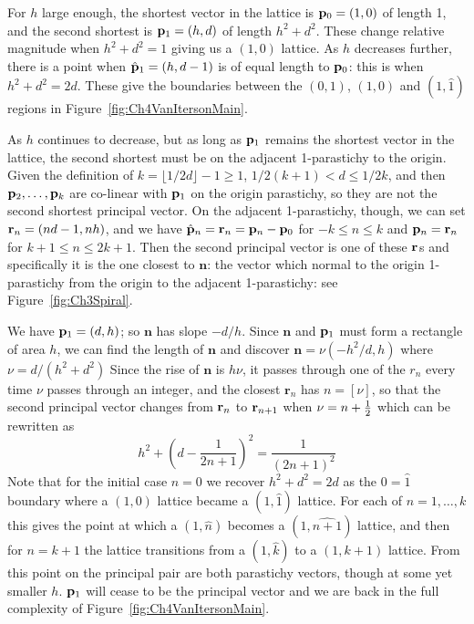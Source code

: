 \begin{jAnswer}
For $h$ large enough, 	the shortest vector in the lattice is  ${\mathbf p}_{0}=(1,0)$ 
of length 1, and the second shortest is  ${\mathbf p}_{1}=(h,d)$ of length $h^2+d^2$.
These change relative magnitude when $h^2+d^2=1$ giving us a $(1,0)$ lattice.
As $h$ decreases further, there is a point when  $\hat{\mathbf p}_{1}=(h,d-1)$ is of equal length to ${\mathbf p}_{0}$: this is when $h^2+d^2=2d$. These give the boundaries between the $(0,1)$, $(1,0)$ and $(1,\hat 1)$ regions in Figure~\ref{fig:Ch4VanItersonMain}. 

As $h$ continues to decrease, but as long as ${\mathbf p}_{1}$ remains the shortest vector in the lattice, the second shortest
must be on the adjacent 1-parastichy to the origin. Given the definition of $k=\lfloor1/2d\rfloor-1\geq 1$, $1/2(k+1)<d\leq 1/2k$,  and then ${\mathbf p}_{2},\ldots,{\mathbf p}_{k}$ are co-linear with ${\mathbf p}_{1}$ on the origin parastichy, so they are not the second shortest principal vector. On the adjacent 1-parastichy, though, we can set $\mathbf{r}_{n}=  (nd-1,n h)$, and we have $\hat{\mathbf p}_{n}=\mathbf{r}_{n}={\mathbf p}_{n}-{\mathbf p}_{0}$ for $-k\leq n\leq k$ and ${\mathbf p}_{n}=\mathbf{r}_{n}$ for $k+1\leq n\leq 2k+1$. Then the second principal vector is one of these $\mathbf{r}_{}$s and specifically it is the one closest to $\mathbf{n}$: the vector which normal to the origin 1-parastichy from the origin to the adjacent 1-parastichy: see Figure~\ref{fig:Ch3Spiral}.
%

We have ${\mathbf p}_{1}=(d,h)$; so $\mathbf{n}$  has slope $-d/h$. Since   $\mathbf{n}$ and ${\mathbf p}_{1}$
must form a rectangle of area $h$, we can find the length of  $\mathbf{n}$ and discover  $\mathbf{n} = \nu (-h^2 /d,h)$
where 
$
	\nu = 
	{d}/{(h^2+d^2)}
$
Since the rise of $\mathbf{n}$ is $h\nu$, it passes through one of the $r_n$ every time $\nu$ passes through an integer,
and the closest  $\mathbf{r}_n$ has $n=[\nu]$, so that the second principal vector changes from $\mathbf{r}_{n}$ to 
$\mathbf{r}_{n+1}$  when $\nu=n+\textstyle{\frac{1}{2}}$ which can be rewritten as 
\begin{equation}
{h^2+\left(d-\frac{1}{2n+1}\right)^2}=  \frac{1}{(2n+1)^2}
\end{equation}
Note that for the initial case $n=0$ we recover $h^2+d^2=2d$ as the $0=\hat{1}$ boundary where a $(1,0)$ lattice became a $(1,\hat 1)$ lattice. For each of $n=1,\ldots,k$ this gives the point at which a  $(1,\hat n)$ becomes a  $(1,\widehat {n+1})$ lattice, and then for $n=k+1$ the lattice transitions from a  $(1,\hat {k})$ to a $(1, {k+1})$ lattice.  From this point on the principal pair are both parastichy vectors, though at some yet smaller $h$.  ${\mathbf p}_{1}$ will cease to be the principal vector and we are back in the full complexity of Figure~\ref{fig:Ch4VanItersonMain}.


\end{jAnswer}
